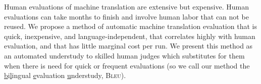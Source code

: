 Human evaluations of machine translation
are extensive but expensive. Human evaluations
can take months to finish and involve
human labor that can not be reused.
We propose a method of automatic machine
translation evaluation that is quick,
inexpensive, and language-independent,
that correlates highly with human evaluation,
and that has little marginal cost per
run. We present this method as an automated
understudy to skilled human judges
which substitutes for them when there is
need for quick or frequent evaluations (so we call our method the \underline{b}i\underline{l}ingual \underline{e}valuation \underline{u}nderstudy, \textsc{Bleu}).
